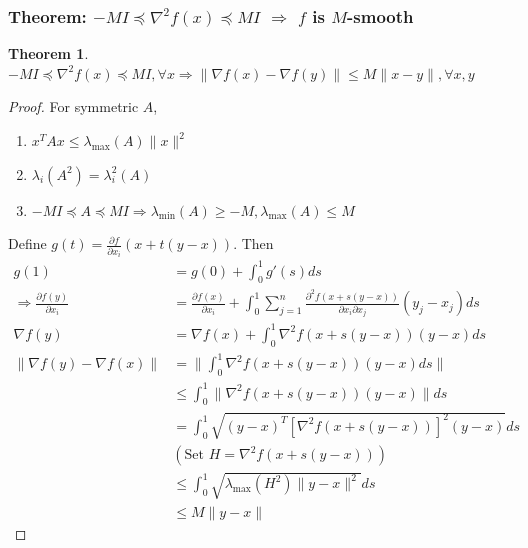 \documentclass[11pt,a4paper]{article}
\newtheorem{theorem}{Theorem}
\begin{document}
\subsubsection{Theorem: $-MI\preceq\nabla^2 f(x)\preceq  MI$ $\Rightarrow$ $f$ is $M$-smooth}
\begin{theorem}
$-MI\preceq\nabla^2 f(x)\preceq  MI, \forall x \Rightarrow \|\nabla f(x)-\nabla f(y)\|\leq M\|x-y\|,\forall x,y$
\end{theorem}
\begin{proof}
For symmetric $A$,
\begin{enumerate}
    \item $x^TAx\leq \lambda_{\max}(A)\|x\|^2$
    \item $\lambda_{i}(A^2)=\lambda_i^2(A)$
    \item $-MI\preceq A\preceq  MI \Rightarrow \lambda_{\min}(A)\geq-M,\lambda_{\max}(A)\leq M$
\end{enumerate}
Define $g(t)=\frac{\partial f}{\partial x_i}(x+t(y-x))$. Then
\begin{equation}
    \begin{aligned}
        g(1)&=g(0)+\int_0^1g'(s)ds\\
        \Rightarrow	\frac{\partial f(y)}{\partial x_i}&=\frac{\partial f(x)}{\partial x_i}+\int_0^1\sum_{j=1}^n \frac{\partial^2 f(x+s(y-x))}{\partial x_i\partial x_j}(y_j-x_j)ds\\
        \nabla f(y)&=\nabla f(x)+\int_0^1 \nabla^2 f(x+s(y-x))(y-x)ds\\
        \|\nabla f(y)-\nabla f(x)\|&=\|\int_0^1 \nabla^2 f(x+s(y-x))(y-x)ds\|\\
        &\leq \int_0^1\|\nabla^2 f(x+s(y-x))(y-x)\|ds\\
        &=\int_0^1\sqrt{(y-x)^T[\nabla^2 f(x+s(y-x))]^2(y-x)}ds\\
        &(\text{Set }H=\nabla^2 f(x+s(y-x)))\\
        &\leq \int_0^1\sqrt{\lambda_{\max}(H^2)\|y-x\|^2}ds\\
        &\leq M\|y-x\|
    \end{aligned}
    \nonumber
\end{equation}
\end{proof}
\end{document}
